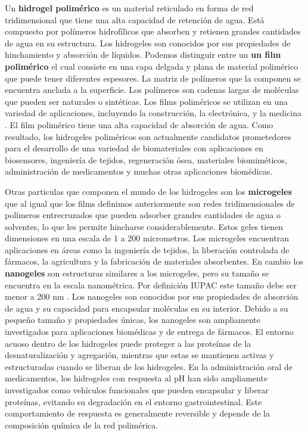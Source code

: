 Un \textbf{hidrogel polim\'erico} es un material reticulado en forma de red tridimensional que tiene una alta capacidad de retenci\'on de agua. Est\'a compuesto por pol\'imeros hidrof\'ilicos que absorben y retienen grandes cantidades de agua en su estructura. Los hidrogeles son conocidos por sus propiedades de hinchamiento y absorci\'on de l\'iquidos.
Podemos distinguir entre un  \textbf{un film polim\'erico} el cual consiste en una capa delgada y plana de material polim\'erico que puede tener diferentes espesores. La  matriz de pol\'imeros que la componen se encuentra anclada a la superficie. Los pol\'imeros son cadenas largas de mol\'eculas que pueden ser naturales o sint\'eticas. Los films polim\'ericos se utilizan en una variedad de aplicaciones, incluyendo la construcci\'on, la electr\'onica, y la medicina \addcite.
El film polim\'erico  tiene una alta capacidad de absorci\'on de agua. Como resultado, los hidrogeles polim\'ericos son actualmente candidatos prometedores para el desarrollo de una variedad de biomateriales con aplicaciones en biosensores, ingenier\'ia de tejidos, regeneraci\'on \'osea, materiales biomim\'eticos, administraci\'on de medicamentos y muchas otras aplicaciones biom\'edicas. \cite{Daly2020}

Otras particulas que componen el mundo de los hidrogeles son los \textbf{microgeles}  que al igual que los films definimos anteriormente son redes tridimensionales de pol\'imeros entrecruzados que pueden adsorber grandes cantidades de agua o solventes, lo que les permite hincharse considerablemente. Estos geles tienen dimensiones en una escala de 1 a 200 micrometros. Los microgeles encuentran aplicaciones en \'areas como la ingenier\'ia de tejidos, la liberaci\'on controlada de f\'armacos, la agricultura y la fabricaci\'on de materiales absorbentes. 
En cambio los  \textbf{nanogeles} son estructuras similares a los microgeles, pero su tama\~no se encuentra en la escala nanom\'etrica. Por definici\'on IUPAC este tama\~no debe ser menor a 200 nm \addcite. Los nanogeles son conocidos por sus propiedades de absorci\'on de agua y su capacidad para encapsular mol\'eculas en su interior. Debido a su peque\~no tama\~no y propiedades \'unicas, los nanogeles son ampliamente investigados para aplicaciones biom\'edicas y de entrega de f\'armacos. %
El entorno acuoso dentro de los hidrogeles puede proteger a las prote\'inas de la desnaturalizaci\'on y agregaci\'on, mientras que estas se mantienen activas y estructuradas cuando se liberan de los hidrogeles. 
En la administraci\'on oral de medicamentos, los hidrogeles con respuesta al pH han sido ampliamente investigados como veh\'iculos funcionales que pueden encapsular y liberar prote\'inas, evitando su degradaci\'on en el entorno gastrointestinal.
Este comportamiento de respuesta es  generalmente reversible y depende de la composici\'on qu\'imica de la red polim\'erica.


